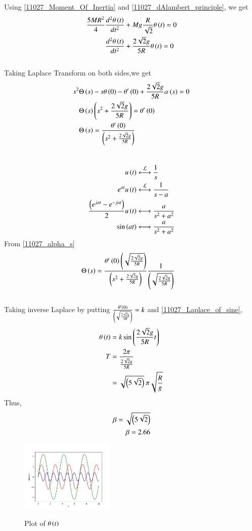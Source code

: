 \documentclass[journal,12pt,twocolumn]{IEEEtran}
\theoremstyle{remark}
\begin{document}
Using \eqref{11027_Moment_Of_Inertia} and \eqref{11027_dAlambert_principle}, we get
\begin{align}
	\frac{5MR^2}{4}&\frac{d^2 \theta \left(t\right)}{dt^2} + Mg\frac{R}{\sqrt{2}} \theta \left(t\right) = 0\\
	&\frac{d^2 \theta \left(t\right)}{dt^2} + \frac{2\sqrt{2}g}{5R} \theta \left(t\right)= 0 	
\end{align}
\\
Taking Laplace Transform on both sides,we get
\begin{align}
	s^2\Theta \left(s\right) &- s \theta \left(0\right) - \theta ' \left(0\right) + \frac{2\sqrt{2}g}{5R} \alpha\left(s\right)= 0\\
	\Theta\left(s\right)&\left(s^2+\frac{2\sqrt{2}g}{5R}\right) = \theta ' \left(0\right)\\
	\Theta\left(s\right)&= \frac{\theta ' \left(0\right)}{\left(s^2 + \frac{2\sqrt{2}g}{5R}\right)} \label{11027_alpha_s}
\end{align}
\\
\begin{align}
	u\brak{t}&\system{L}\frac{1}{s}\\
	e^{at}u\brak{t}&\system{L}\frac{1}{s-a}\\
	\frac{\brak{e^{jat} - e^{-jat}}}{2}u\brak{t}&\system \frac{a}{s^2+a^2}\\
	\sin\brak{at}&\system\frac{a}{s^2+a^2} \label{11027_Laplace_of_sine}
\end{align}
From \eqref{11027_alpha_s}
\begin{align}
	\Theta\left(s\right)&= \frac{\theta ' \left(0\right) \left(\sqrt{\frac{2\sqrt{2}g}{5R} }\right) }{\left(s^2 + \frac{2\sqrt{2}g}{5R}\right)} \frac{1}{ \left(\sqrt{\frac{2\sqrt{2}g}{5R} }\right) }
\end{align}
\\
Taking inverse Laplace by putting $\frac{\theta ' \left(0\right)}{\left(\sqrt{\frac{2\sqrt{2}g}{5R}}\right)} = k$ and \eqref{11027_Laplace_of_sine}, 
\begin{align}
	\theta \left(t\right) &= k \sin\left(\frac{2\sqrt{2}g}{5R} t\right)\\
	T &= \frac{2 \pi}{\frac{2\sqrt{2}g}{5R}}\\
	&= \sqrt{\left(5\sqrt{2}\right)}\:\pi \sqrt{\frac{R}{g}}
\end{align}
Thus, 
\begin{align}
	\beta = \sqrt{\left(5\sqrt{2}\right)}\\
	\beta = 2.66
\end{align}
\begin{figure}[h]
    \includegraphics[width=0.4\textwidth]{figs/theta_t_plot.png}\label{11027_GATE_ME_32_thetaplot}
    \caption{Plot of $\theta\left(t\right)$}
\end{figure}
\end{document}
